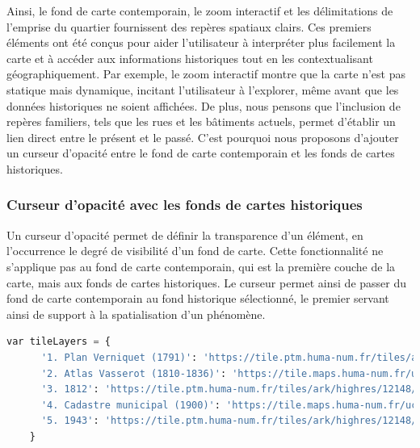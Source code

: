 Ainsi, le fond de carte contemporain, le zoom interactif et les délimitations de l'emprise du quartier fournissent des repères spatiaux clairs. Ces premiers éléments ont été conçus pour aider l'utilisateur à interpréter plus facilement la carte et à accéder aux informations historiques tout en les contextualisant géographiquement. Par exemple, le zoom interactif montre que la carte n'est pas statique mais dynamique, incitant l'utilisateur à l'explorer, même avant que les données historiques ne soient affichées. De plus, nous pensons que l'inclusion de repères familiers, tels que les rues et les bâtiments actuels, permet d'établir un lien direct entre le présent et le passé. C'est pourquoi nous proposons d'ajouter un curseur d'opacité entre le fond de carte contemporain et les fonds de cartes historiques.

\subsubsection{Curseur d'opacité avec les fonds de cartes historiques}
Un curseur d'opacité permet de définir la transparence d'un élément, en l'occurrence le degré de visibilité d'un fond de carte.  Cette fonctionnalité ne s'applique pas au fond de carte contemporain, qui est la première couche de la carte, mais aux fonds de cartes historiques. Le curseur permet ainsi de passer du fond de carte contemporain au fond historique sélectionné, le premier servant ainsi de support à la spatialisation d'un phénomène. 
\begin{lstlisting}[language=PYTHON, caption=Variable qui stocke les fonds de cartes historiques en JavaScript]
 var tileLayers = {
      '1. Plan Verniquet (1791)': 'https://tile.ptm.huma-num.fr/tiles/ark/highres/12148/btv1b55013275x/{z}/{x}/{y}.Webp',
      '2. Atlas Vasserot (1810-1836)': 'https://tile.maps.huma-num.fr/uc2usU/d/Alpage_Vasserot_1830/{z}/{x}/{y}.png',
      '3. 1812': 'https://tile.ptm.huma-num.fr/tiles/ark/highres/12148/btv1b530851375/{z}/{x}/{y}.Webp',
      '4. Cadastre municipal (1900)': 'https://tile.maps.huma-num.fr/uc2usU/d/MOSA_1900_PARIS/{z}/{x}/{y}.png',
      '5. 1943': 'https://tile.ptm.huma-num.fr/tiles/ark/highres/12148/btv1b53121232b/{z}/{x}/{y}.Webp', 
    }\end{lstlisting}
    
